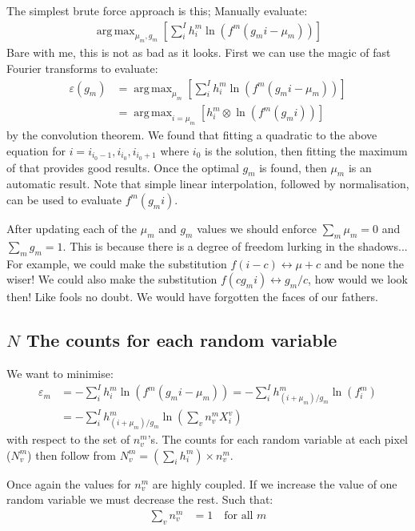 \documentclass[11pt]{article}
\DeclareMathOperator*{\argmax}{arg\,max}
\begin{document}
The simplest brute force approach is this; Manually evaluate:
\begin{align}
   \argmax_{\mu_m, g_m}\left[ \sum_i^I h^m_i \ln(f^m(g_m i - \mu_m)) \right]
\end{align}  
Bare with me, this is not as bad as it looks. First we can use the magic of fast Fourier transforms to evaluate:
\begin{align}
   \varepsilon(g_m) &= \argmax_{\mu_m}\left[ \sum_i^I h^m_i \ln(f^m(g_m i - \mu_m)) \right] \\
   &= \argmax_{i=\mu_m}\left[ h^m_i \otimes \ln(f^m(g_m i)) \right] 
\end{align}  
by the convolution theorem. We found that fitting a quadratic to the above equation for $i = i_{i_0-1}, i_{i_0}, i_{i_0+1}$ where $i_0$ is the solution, then fitting the maximum of that provides good results. 
Once the optimal $g_m$ is found, then $\mu_m$ is an automatic result. Note that simple linear interpolation, followed by normalisation, can be used to evaluate $f^m(g_m i)$.  

After updating each of the $\mu_m$ and $g_m$ values we should enforce $\sum_m \mu_m = 0$ and $\sum_m g_m = 1$. This is because there is a degree of freedom lurking in the shadows... For example, we could make the substitution $f(i - c) \leftrightarrow \mu + c$ and be none the wiser! We could also make the substitution $f(c g_m i) \leftrightarrow g_m / c$, how would we look then! Like fools no doubt. We would have forgotten the faces of our fathers. 
 
\subsection{$N$ The counts for each random variable}
We want to minimise:
\begin{align}
   \varepsilon_m &= -\sum_i^I h^m_i \ln(f^m(g_mi - \mu_m)) = -\sum_i^I h^m_{(i+\mu_m)/g_m} \ln(f^m_i) \\
   &= - \sum_i^I h^m_{(i+\mu_m)/g_m} \ln\left(\sum_v n^m_v X^v_i\right)
\end{align}
with respect to the set of $n^m_v$'s. The counts for each random variable at each pixel ($N^m_v$) then follow from $N^m_v = (\sum_i h^m_i) \times n^m_v$.

Once again the values for $n^m_v$ are highly coupled. If we increase the value of one random variable we must decrease the rest. Such that:
\begin{align}
   \sum_v n^m_v &= 1  \quad \text{for all } m 
\end{align}
\end{document}
